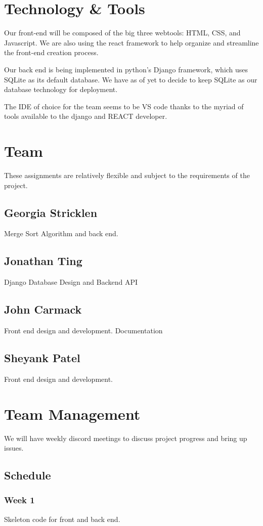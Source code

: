 \documentclass{article}
\begin{document}
\section{Technology \& Tools}
Our front-end will be composed of the big three webtools: HTML, CSS, and Javascript.
We are also using the react framework to help organize and streamline the front-end creation process.  

Our back end is being implemented in python’s Django framework, which uses SQLite as its default database. We have as of yet to decide to keep SQLite as our database technology for deployment.  

The IDE of choice for the team seems to be VS code thanks to the myriad of tools available to the django and REACT developer.

\section{Team}
These assignments are relatively flexible and subject to the requirements of the project. 
\subsection{Georgia Stricklen}
Merge Sort Algorithm and back end.
\subsection{Jonathan Ting}
Django Database Design and Backend API
\subsection{John Carmack}
Front end design and development. Documentation
\subsection{Sheyank Patel}
Front end design and development. 

\section{Team Management}
We will have weekly discord meetings to discuss project progress and bring up issues. 
\subsection{Schedule}
\subsubsection{Week 1}
Skeleton code for front and back end.
\end{document}
